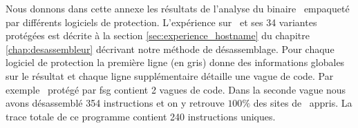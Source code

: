 Nous donnons dans cette annexe les résultats de l'analyse du binaire \hostname\ empaqueté par différents logiciels de protection. L'expérience sur \hostname\ et ses 34 variantes protégées est décrite à la section \ref{sec:experience_hostname} du chapitre \ref{chap:desassembleur} décrivant notre méthode de désassemblage.
Pour chaque logiciel de protection la première ligne (en gris) donne des informations globales sur le résultat et chaque ligne supplémentaire détaille une vague de code.
Par exemple \hostname\ protégé par fsg contient 2 vagues de code. Dans la seconde vague nous avons désassemblé 354 instructions et on y retrouve $100\%$ des sites de \hostname\ appris. La trace totale de ce programme contient 240 instructions uniques.

\begin{landscape}
\begin{small}

\end{small}
\end{landscape}